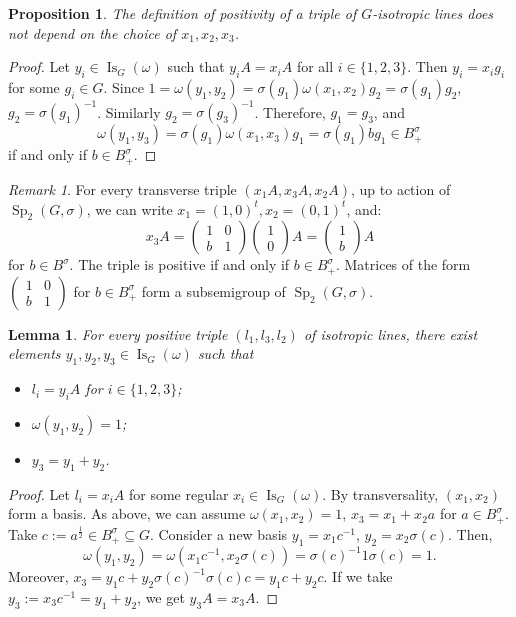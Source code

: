 \documentclass[a4paper,oneside,11pt]{amsart}
\DeclareMathOperator{\Sp}{Sp}
\DeclareMathOperator{\Is}{Is}
\theoremstyle{plain}
\newtheorem{lem}[teo]{Lemma}
\newtheorem{prop}[teo]{Proposition}
\theoremstyle{definition}
\theoremstyle{remark}
\newtheorem{rem}[teo]{Remark}
\begin{document}
\begin{prop}
The definition of positivity of a triple of $G$-isotropic lines does not depend on the choice of $x_1,x_2,x_3$.
\end{prop}

\begin{proof}
Let $y_i\in \Is_G(\omega)$ such that $y_iA=x_iA$ for all $i\in\{1,2,3\}$. Then $y_i=x_ig_i$ for some $g_i\in G$. Since $1=\omega(y_1,y_2)=\sigma(g_1)\omega(x_1,x_2)g_2=\sigma(g_1)g_2$, $g_2=\sigma(g_1)^{-1}$. Similarly $g_2=\sigma(g_3)^{-1}$. Therefore, $g_1=g_3$, and
$$\omega(y_1,y_3)=\sigma(g_1)\omega(x_1,x_3)g_1=\sigma(g_1)bg_1\in B^{\sigma}_+$$
if and only if $b\in B^{\sigma}_+$.
\end{proof}


\begin{rem}
For every transverse triple $(x_1A,x_3A,x_2A)$, up to action of $\Sp_2(G,\sigma)$, we can write $x_1=(1,0)^t,x_2=(0,1)^t$, and:
$$x_3A=\begin{pmatrix}
1 & 0 \\
b & 1
\end{pmatrix}
\begin{pmatrix}
1 \\
0
\end{pmatrix}A
=\begin{pmatrix}
1 \\
b
\end{pmatrix}A$$
for $b\in B^{\sigma}$. The triple is positive if and only if $b\in B^{\sigma}_+$. Matrices of the form $\begin{pmatrix}
1 & 0 \\
b & 1
\end{pmatrix}$ for $b\in B^{\sigma}_+$ form a subsemigroup of $\Sp_2(G,\sigma)$.
\end{rem}

\begin{lem}\label{trans3}
For every positive triple $(l_1,l_3,l_2)$ of isotropic lines, there exist elements $y_1,y_2,y_3\in\Is_G(\omega)$ such that
\begin{itemize}
\item $l_i=y_iA$ for $i\in\{1,2,3\}$;
\item $\omega(y_1,y_2)=1$;
\item $y_3=y_1+y_2$.
\end{itemize}
\end{lem}

\begin{proof}
Let $l_i=x_iA$ for some regular $x_i\in \Is_G(\omega)$. By transversality, $(x_1,x_2)$ form a basis. As above, we can assume $\omega(x_1,x_2)=1$, $x_3=x_1+x_2a$ for $a\in B^{\sigma}_+$. Take $c:=a^\frac{1}{2}\in B^{\sigma}_+\subseteq G$. Consider a new basis $y_1=x_1c^{-1}$, $y_2=x_2\sigma(c)$. Then,
$$\omega(y_1,y_2)=\omega(x_1c^{-1},x_2\sigma(c))=\sigma(c)^{-1}1\sigma(c)=1.$$
Moreover, $x_3=y_1c+y_2\sigma(c)^{-1}\sigma(c)c=y_1c+y_2c$. If we take $y_3:=x_3c^{-1}=y_1+y_2$, we get $y_3A=x_3A$.
\end{proof}
\end{document}

